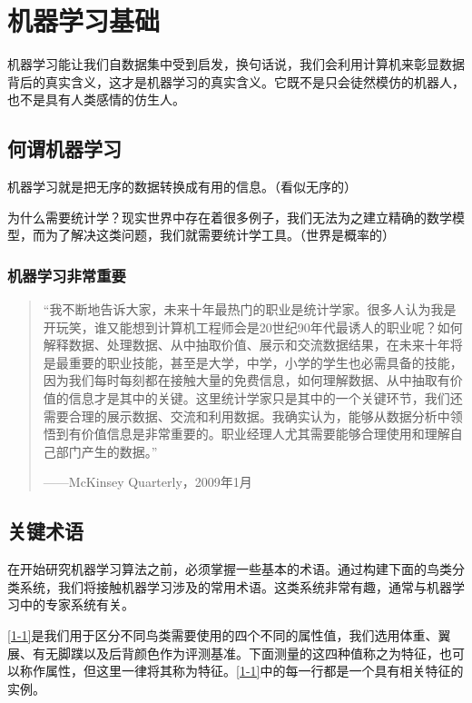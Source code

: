 \chapter{机器学习基础}
机器学习能让我们自数据集中受到启发，换句话说，我们会利用计算机来彰显数据背后的真实含义，这才是机器学习的真实含义。它既不是只会徒然模仿的机器人，也不是具有人类感情的仿生人。
\section{何谓机器学习}
机器学习就是把无序的数据转换成有用的信息。（看似无序的）

为什么需要统计学？现实世界中存在着很多例子，我们无法为之建立精确的数学模型，而为了解决这类问题，我们就需要统计学工具。（世界是概率的）
\subsection{机器学习非常重要}
\begin{quotation}
    “我不断地告诉大家，未来十年最热门的职业是统计学家。很多人认为我是开玩笑，谁又能想到计算机工程师会是20世纪90年代最诱人的职业呢？如何解释数据、处理数据、从中抽取价值、展示和交流数据结果，在未来十年将是最重要的职业技能，甚至是大学，中学，小学的学生也必需具备的技能，因为我们每时每刻都在接触大量的免费信息，如何理解数据、从中抽取有价值的信息才是其中的关键。这里统计学家只是其中的一个关键环节，我们还需要合理的展示数据、交流和利用数据。我确实认为，能够从数据分析中领悟到有价值信息是非常重要的。职业经理人尤其需要能够合理使用和理解自己部门产生的数据。”
    \begin{flushright}
        ——McKinsey Quarterly，2009年1月
    \end{flushright}
\end{quotation}
\section{关键术语}
在开始研究机器学习算法之前，必须掌握一些基本的术语。通过构建下面的鸟类分类系统，我们将接触机器学习涉及的常用术语。这类系统非常有趣，通常与机器学习中的专家系统有关。

\autoref{1-1}是我们用于区分不同鸟类需要使用的四个不同的属性值，我们选用体重、翼展、有无脚蹼以及后背颜色作为评测基准。下面测量的这四种值称之为特征，也可以称作属性，但这里一律将其称为特征。\autoref{1-1}中的每一行都是一个具有相关特征的实例。

